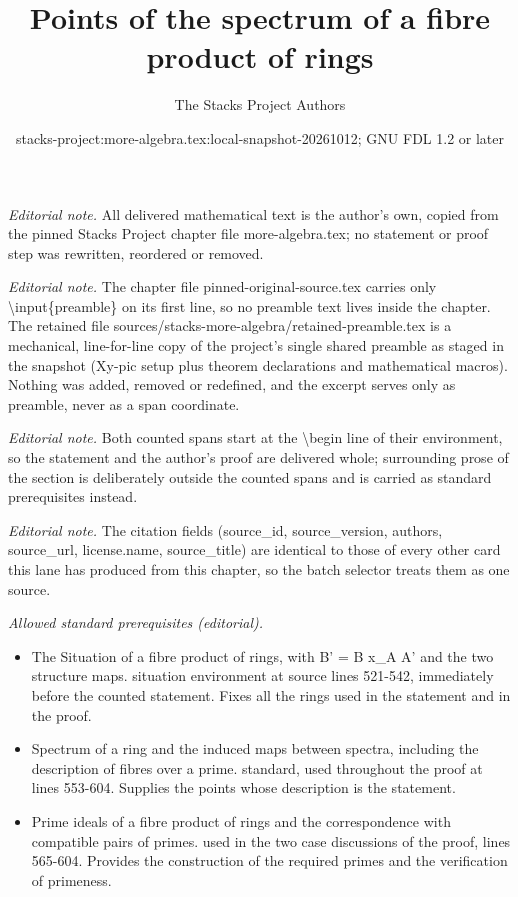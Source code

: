 \documentclass[10pt,a4paper]{amsart}
\title{Points of the spectrum of a fibre product of rings}
\author{The Stacks Project Authors}
\date{stacks-project:more-algebra.tex:local-snapshot-20261012; GNU FDL 1.2 or later}
\theoremstyle{plain}
\theoremstyle{definition}
\theoremstyle{remark}
\numberwithin{equation}{subsection}
\begin{document}
\maketitle
\setcounter{subsection}{1}
\noindent\textit{Editorial note.} All delivered mathematical text is the author's own, copied from the pinned Stacks Project chapter file more-algebra.tex; no statement or proof step was rewritten, reordered or removed.\par\medskip
\noindent\textit{Editorial note.} The chapter file pinned-original-source.tex carries only \textbackslash{}input\{preamble\} on its first line, so no preamble text lives inside the chapter. The retained file sources/stacks-more-algebra/retained-preamble.tex is a mechanical, line-for-line copy of the project's single shared preamble as staged in the snapshot (Xy-pic setup plus theorem declarations and mathematical macros). Nothing was added, removed or redefined, and the excerpt serves only as preamble, never as a span coordinate.\par\medskip
\noindent\textit{Editorial note.} Both counted spans start at the \textbackslash{}begin line of their environment, so the statement and the author's proof are delivered whole; surrounding prose of the section is deliberately outside the counted spans and is carried as standard prerequisites instead.\par\medskip
\noindent\textit{Editorial note.} The citation fields (source\_id, source\_version, authors, source\_url, license.name, source\_title) are identical to those of every other card this lane has produced from this chapter, so the batch selector treats them as one source.\par\medskip
\noindent\textit{Allowed standard prerequisites (editorial).}\begin{itemize}
\item The Situation of a fibre product of rings, with B' = B x\_A A' and the two structure maps. situation environment at source lines 521-542, immediately before the counted statement. Fixes all the rings used in the statement and in the proof.
\item Spectrum of a ring and the induced maps between spectra, including the description of fibres over a prime. standard, used throughout the proof at lines 553-604. Supplies the points whose description is the statement.
\item Prime ideals of a fibre product of rings and the correspondence with compatible pairs of primes. used in the two case discussions of the proof, lines 565-604. Provides the construction of the required primes and the verification of primeness.
\end{itemize}\medskip
\end{document}
